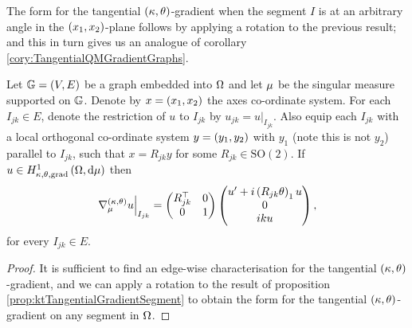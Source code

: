 The form for the tangential $\left( \kappa, \theta \right)$-gradient when the segment $I$ is at an arbitrary angle in the $\left( x_1,x_2 \right)$-plane follows by applying a rotation to the previous result; and this in turn gives us an analogue of corollary \ref{cory:TangentialQMGradientGraphs}.
\begin{cory} \label{cory:ktTangentialGradientForm}
	Let $\mathbb{G}=\left( V,E \right)$ be a graph embedded into $\Omega$ and let $\mu$ be the singular measure supported on $\mathbb{G}$.
	Denote by $x=\left( x_1,x_2 \right)$ the axes co-ordinate system.
	For each $I_{jk}\in E$, denote the restriction of $u$ to $I_{jk}$ by $u_{jk} = u\vert_{I_{jk}}$.
	Also equip each $I_{jk}$ with a local orthogonal co-ordinate system $y=\left( y_1,y_2 \right)$ with $y_1$ (note this is not $y_2$) parallel to $I_{jk}$, such that $x=R_{jk}y$ for some $R_{jk}\in\mathrm{SO}(2)$.
	If $u\in H^1_{\kappa,\theta,\mathrm{grad}}\left( \Omega, \mathrm{d}\mu \right)$ then
	\begin{align*}
		\left.\nabla^{\left( \kappa, \theta \right)}_{\mu}u\right\vert_{I_{jk}} = \begin{pmatrix} R_{jk}^\top & 0 \\ 0 & 1 \end{pmatrix} \begin{pmatrix} u' + i\left( R_{jk}\theta \right)_1 u \\ 0 \\ iku \end{pmatrix},
	\end{align*}
	for every $I_{jk}\in E$.
\end{cory}
\begin{proof}
	It is sufficient to find an edge-wise characterisation for the tangential $\left( \kappa, \theta \right)$-gradient, and we can apply a rotation to the result of proposition \ref{prop:ktTangentialGradientSegment} to obtain the form for the tangential $\left( \kappa, \theta \right)$-gradient on any segment in $\Omega$.
\end{proof}

